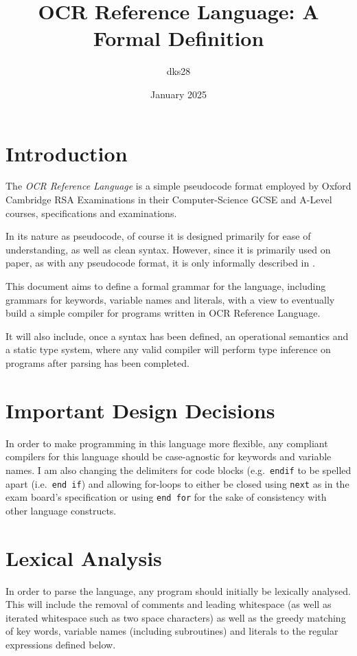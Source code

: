 \documentclass{article}
\title{OCR Reference Language: A Formal Definition}
\author{dks28}
\date{January 2025}
\newcommand{\code}[1]{\colorbox{gray!20}{\texttt{#1}}}
\begin{document}
\maketitle


\section*{Introduction}
The \emph{OCR Reference Language} is a simple pseudocode format 
employed by Oxford Cambridge RSA Examinations in their 
Computer-Science GCSE and A-Level courses, specifications and 
examinations.

In its nature as pseudocode, of course it is designed primarily for 
ease of understanding, as well as clean syntax. However, since it 
is primarily used on paper, as with any pseudocode format, it is 
only informally described in \cite{H446Spec}.

This document aims to define a formal grammar for the language, including grammars for keywords, variable names and literals, with a view to eventually build a simple compiler for programs written in OCR Reference Language.

It will also include, once a syntax has been defined, an operational semantics and a static type system, where any valid compiler will perform type inference on programs after parsing has been completed. 

\section*{Important Design Decisions}
In order to make programming in this language more flexible, any compliant compilers for this language should be case-agnostic for keywords and variable names. I am also changing the delimiters for code blocks (e.g.\ \code{endif} to be spelled apart (i.e.\ \code{end if}) and allowing for-loops to either be closed using \code{next} as in the exam board's specification or using \code{end for} for the sake of consistency with other language constructs. 

\section{Lexical Analysis}

    In order to parse the language, any program should initially be lexically analysed. This will include the removal of comments and leading whitespace (as well as iterated whitespace such as two space characters) as well as the greedy matching of key words, variable names (including subroutines) and literals to the regular expressions defined below.
\end{document}
